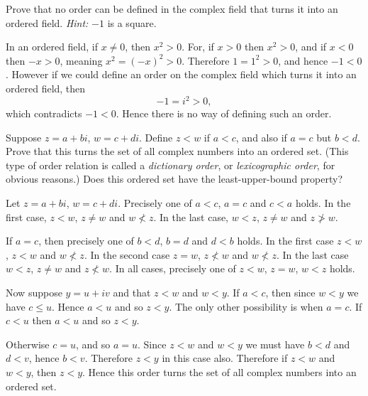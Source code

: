 \begin{questions}

  \question Prove that no order can be defined in the complex field that turns it into an ordered field. \emph{Hint:} $-1$ is a square.
  \begin{solution}
    In an ordered field, if $x\neq0$, then $x^2>0$. For, if $x>0$ then $x^2>0$, and if $x<0$ then $-x>0$, meaning $x^2=(-x)^2>0$. Therefore $1=1^2>0$, and hence $-1<0$. However if we could define an order on the complex field which turns it into an ordered field, then
    \[ -1 = i^2 > 0, \]
    which contradicts $-1<0$. Hence there is no way of defining such an order.
  \end{solution}

  \question Suppose $z=a+bi$, $w=c+di$. Define $z<w$ if $a<c$, and also if $a=c$ but $b<d$. Prove that this turns the set of all complex numbers into an ordered set. (This type of order relation is called a \emph{dictionary order}, or \emph{lexicographic order}, for obvious reasons.) Does this ordered set have the least-upper-bound property?
  \begin{solution}
    Let $z=a+bi$, $w=c+di$. Precisely one of $a<c$, $a=c$ and $c<a$ holds. In the first case, $z<w$, $z\neq w$ and $w\not<z$. In the last case, $w<z$, $z\neq w$ and $z\not>w$.

    If $a=c$, then precisely one of $b<d$, $b=d$ and $d<b$ holds. In the first case $z<w$, $z<w$ and $w\not<z$. In the second case $z=w$, $z\not<w$ and $w\not<z$. In the last case $w<z$, $z\neq w$ and $z\not<w$. In all cases, precisely one of $z<w$, $z=w$, $w<z$ holds.

    Now suppose $y=u+iv$ and that $z<w$ and $w<y$. If $a<c$, then since $w<y$ we have $c\leq u$. Hence $a<u$ and so $z<y$. The only other possibility is when $a=c$. If $c<u$ then $a<u$ and so $z<y$.

    Otherwise $c=u$, and so $a=u$. Since $z<w$ and $w<y$ we must have $b<d$ and $d<v$, hence $b<v$. Therefore $z<y$ in this case also. Therefore if $z<w$ and $w<y$, then $z<y$. Hence this order turns the set of all complex numbers into an ordered set.


\end{solution}
\end{questions}

